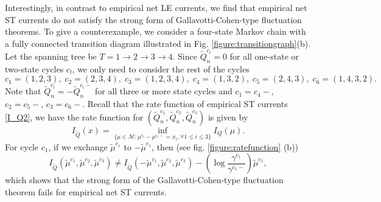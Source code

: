 Interestingly, in contrast to empirical net LE currents, we find that empirical net ST currents do not satisfy the strong form of Gallavotti-Cohen-type fluctuation theorems. To give a counterexample, we consider a four-state Markov chain with a fully connected transition diagram illustrated in Fig. \ref{figure:transitiongraph}(b). Let the spanning tree be $T=1\to2\to3\to4$. Since $\tilde{Q}^{c_l}_n=0$ for all one-state or two-state cycles $c_l$, we only need to consider the rest of the cycles
\begin{equation*}
	c_1 = (1,2,3),\;c_2 = (2,3,4),\;c_3 = (1,2,3,4),\;c_4 = (1,3,2),\;
	c_5 = (2,4,3),\;c_6 = (1,4,3,2).
\end{equation*}
Note that $\tilde{Q}^{c_l}_n=-\tilde{Q}^{c_l-}_n$ for all three or more state cycles and $c_1=c_4-$, $c_2=c_5-$, $c_3=c_6-$. Recall that the rate function of empirical ST currents \eqref{I_Q2}, we have the rate function for $(\tilde{Q}^{c_1}_n,\tilde{Q}^{c_2}_n,\tilde{Q}^{c_3}_n)$ is given by
\begin{equation*}
	I_{\tilde{Q}}(x)=\inf_{\{\mu\in\mathcal{M}:\mu^{c_i}-\mu^{c_i-}= x_i,\forall 1\le i\le 3\}}I_Q(\mu).
\end{equation*}
For cycle $c_1$, if we exchange $\tilde{\mu}^{c_1}$ to $-\tilde{\mu}^{c_1}$, then (see fig. \ref{figure:ratefunction} (b))
\begin{equation*}
I_{\tilde{Q}}(\tilde{\mu}^{c_1},\tilde{\mu}^{c_2},\tilde{\mu}^{c_3})\neq I_{\tilde{Q}}(-\tilde{\mu}^{c_1},\tilde{\mu}^{c_2},\tilde{\mu}^{c_3})
-\left(\log\frac{\gamma^{c_1}}{\gamma^{c_1-}}\right)\tilde{\mu}^{c_1},
\end{equation*}
which shows that the strong form of the Gallavotti-Cohen-type fluctuation theorem fails for empirical net ST currents.